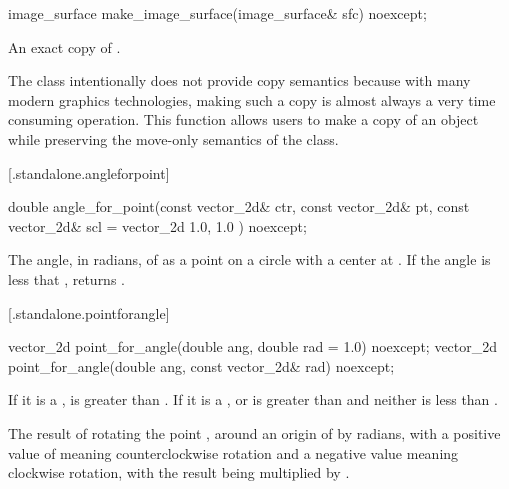 %
\begin{itemdecl}
image_surface make_image_surface(image_surface& sfc) noexcept;
\end{itemdecl}
\begin{itemdescr}
\pnum
\returns
An exact copy of .

\pnum
\begin{note}
The  class intentionally does not provide copy semantics because with many modern graphics technologies, making such a copy is almost always a very time consuming operation. This function allows users to make a copy of an  object while preserving the move-only semantics of the  class.
\end{note}
\end{itemdescr}
 [\iotwod.standalone.angleforpoint] {}

%
\begin{itemdecl}
double angle_for_point(const vector_2d& ctr, const vector_2d& pt,
  const vector_2d& scl = vector_2d{ 1.0, 1.0 }) noexcept;
\end{itemdecl}
\begin{itemdescr}
\pnum
\returns
The angle, in radians, of  as a point on a circle with a center at . If the angle is less that , returns .
\end{itemdescr}

 [\iotwod.standalone.pointforangle] {}

%
\begin{itemdecl}
vector_2d point_for_angle(double ang, double rad = 1.0) noexcept;
vector_2d point_for_angle(double ang, const vector_2d& rad) noexcept;
\end{itemdecl}
\begin{itemdescr}
\pnum
\requires
If it is a ,  is greater than . If it is a ,  or  is greater than  and neither is less than .

\pnum
\returns
The result of rotating the point , around an origin of  by  radians, with a positive value of  meaning counterclockwise rotation and a negative value meaning clockwise rotation, with the result being multiplied by .
\end{itemdescr}

